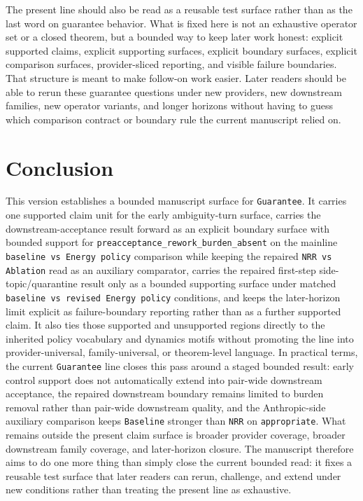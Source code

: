\documentclass[11pt]{article}
\begin{document}
The present line should also be read as a reusable test surface rather than as
the last word on guarantee behavior. What is fixed here is not an exhaustive
operator set or a closed theorem, but a bounded way to keep later work honest:
explicit supported claims, explicit supporting surfaces, explicit boundary
surfaces, explicit comparison surfaces, provider-sliced reporting, and visible
failure boundaries. That
structure is meant to make follow-on work easier. Later readers should be able
to rerun these guarantee questions under new providers, new downstream
families, new operator variants, and longer horizons without having to guess
which comparison contract or boundary rule the current manuscript relied on.

\section{Conclusion}

This version establishes a bounded manuscript surface for \texttt{Guarantee}.
It carries one supported claim unit for the early ambiguity-turn surface,
carries the downstream-acceptance result forward as an explicit boundary
surface with bounded support for
\texttt{preacceptance\_rework\_burden\_absent} on the mainline
\texttt{baseline vs Energy policy} comparison while keeping the repaired
\texttt{NRR vs Ablation} read as an auxiliary comparator, carries the repaired
first-step side-topic/quarantine result only as a bounded supporting surface
under matched \texttt{baseline vs revised Energy policy} conditions, and keeps
the later-horizon limit explicit as failure-boundary reporting rather than as
a further supported claim. It also ties those supported and unsupported regions
directly to the inherited policy vocabulary and dynamics motifs without
promoting the line into provider-universal, family-universal, or theorem-level
language. In practical terms, the current \texttt{Guarantee} line closes this
pass around a staged bounded result: early control support does not
automatically extend into pair-wide downstream acceptance, the repaired
downstream boundary remains limited to burden removal rather than pair-wide
downstream quality, and the Anthropic-side auxiliary comparison keeps
\texttt{Baseline} stronger than \texttt{NRR} on \texttt{appropriate}. What
remains outside the present claim
surface is broader provider coverage, broader downstream family coverage, and
later-horizon closure. The manuscript therefore aims to do one more thing than
simply close the current bounded read: it fixes a reusable test surface that
later readers can rerun, challenge, and extend under new conditions rather
than treating the present line as exhaustive.
\end{document}
